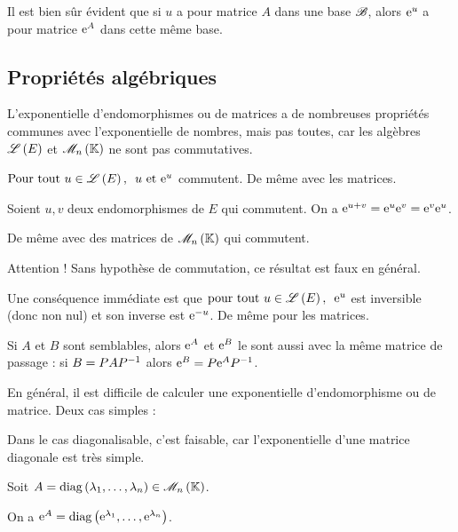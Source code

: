 Il est bien sûr évident que si \(u\) a pour matrice \(A\) dans une base \(\mathscr{B}\), alors \(\mathrm{e}^{u}\) a pour matrice \(\mathrm{e}^{A}\) dans cette même base.

\subsection{Propriétés algébriques}

L'exponentielle d'endomorphismes ou de matrices a de nombreuses propriétés communes avec l'exponentielle de nombres, mais pas toutes, car les algèbres \(\mathscr{L}\left(E\right)\) et \(\M{n}\) ne sont pas commutatives.

\begin{prop}
\(\quantifs{\Tpt u\in\Lendo{E}}u\text{ et }\e{u}\) commutent. De même avec les matrices.
\end{prop}

\begin{prop}
Soient \(u,v\) deux endomorphismes de \(E\) qui commutent. On a \(\mathrm{e}^{u+v}=\mathrm{e}^{u}\mathrm{e}^{v}=\mathrm{e}^{v}\mathrm{e}^{u}\).

De même avec des matrices de \(\M{n}\) qui commutent.
\end{prop}

Attention ! Sans hypothèse de commutation, ce résultat est faux en général.

Une conséquence immédiate est que \(\quantifs{\tpt u\in\Lendo{E}}\e{u}\) est inversible (donc non nul) et son inverse est \(\mathrm{e}^{-u}\). De même pour les matrices.

Si \(A\) et \(B\) sont semblables, alors \(\mathrm{e}^{A}\) et \(\mathrm{e}^{B}\) le sont aussi avec la même matrice de passage : si \(B=PAP^{-1}\) alors \(\mathrm{e}^{B}=P\mathrm{e}^{A}P^{-1}\).

En général, il est difficile de calculer une exponentielle d'endomorphisme ou de matrice. Deux cas simples :

Dans le cas diagonalisable, c'est faisable, car l'exponentielle d'une matrice diagonale est très simple.

\begin{prop}
Soit \(A=\diag{\lambda_1,\dots,\lambda_n}\in\M{n}\).

On a \(\mathrm{e}^{A}=\operatorname{diag}\left(\mathrm{e}^{\lambda_1},\dots,\mathrm{e}^{\lambda_n}\right)\).
\end{prop}

